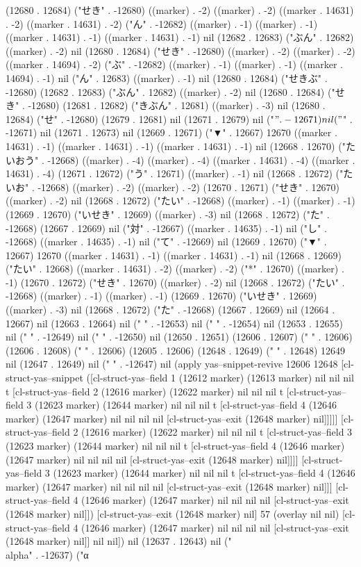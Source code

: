 (12680 . 12684) ("せき" . -12680) ((marker) . -2) ((marker) . -2) ((marker . 14631) . -2) ((marker . 14631) . -2) ("ん" . -12682) ((marker) . -1) ((marker) . -1) ((marker . 14631) . -1) ((marker . 14631) . -1) nil (12682 . 12683) ("ぶん" . 12682) ((marker) . -2) nil (12680 . 12684) ("せき" . -12680) ((marker) . -2) ((marker) . -2) ((marker . 14694) . -2) ("ぶ" . -12682) ((marker) . -1) ((marker) . -1) ((marker . 14694) . -1) nil ("ん" . 12683) ((marker) . -1) nil (12680 . 12684) ("せきぶ" . -12680) (12682 . 12683) ("ぶん" . 12682) ((marker) . -2) nil (12680 . 12684) ("せき" . -12680) (12681 . 12682) ("きぶん" . 12681) ((marker) . -3) nil (12680 . 12684) ("せ" . -12680) (12679 . 12681) nil (12671 . 12679) nil ("$" . -12671) nil ("$" . -12671) nil (12671 . 12673) nil (12669 . 12671) ("▼" . 12667) 12670 ((marker . 14631) . -1) ((marker . 14631) . -1) ((marker . 14631) . -1) nil (12668 . 12670) ("たいおう" . -12668) ((marker) . -4) ((marker) . -4) ((marker . 14631) . -4) ((marker . 14631) . -4) (12671 . 12672) ("う" . 12671) ((marker) . -1) nil (12668 . 12672) ("たいお" . -12668) ((marker) . -2) ((marker) . -2) (12670 . 12671) ("せき" . 12670) ((marker) . -2) nil (12668 . 12672) ("たい" . -12668) ((marker) . -1) ((marker) . -1) (12669 . 12670) ("いせき" . 12669) ((marker) . -3) nil (12668 . 12672) ("た" . -12668) (12667 . 12669) nil ("対" . -12667) ((marker . 14635) . -1) nil ("し" . -12668) ((marker . 14635) . -1) nil ("て" . -12669) nil (12669 . 12670) ("▼" . 12667) 12670 ((marker . 14631) . -1) ((marker . 14631) . -1) nil (12668 . 12669) ("たい" . 12668) ((marker . 14631) . -2) ((marker) . -2) ("*" . 12670) ((marker) . -1) (12670 . 12672) ("せき" . 12670) ((marker) . -2) nil (12668 . 12672) ("たい" . -12668) ((marker) . -1) ((marker) . -1) (12669 . 12670) ("いせき" . 12669) ((marker) . -3) nil (12668 . 12672) ("た" . -12668) (12667 . 12669) nil (12664 . 12667) nil (12663 . 12664) nil ("
" . -12653) nil (" " . -12654) nil (12653 . 12655) nil ("
" . -12649) nil (" " . -12650) nil (12650 . 12651) (12606 . 12607) ("  " . 12606) (12606 . 12608) (" " . 12606) (12605 . 12606) (12648 . 12649) (" " . 12648) 12649 nil (12647 . 12649) nil (" " . -12647) nil (apply yas--snippet-revive 12606 12648 [cl-struct-yas--snippet ([cl-struct-yas--field 1 (12612 marker) (12613 marker) nil nil nil t [cl-struct-yas--field 2 (12616 marker) (12622 marker) nil nil nil t [cl-struct-yas--field 3 (12623 marker) (12644 marker) nil nil nil t [cl-struct-yas--field 4 (12646 marker) (12647 marker) nil nil nil nil [cl-struct-yas--exit (12648 marker) nil]]]]] [cl-struct-yas--field 2 (12616 marker) (12622 marker) nil nil nil t [cl-struct-yas--field 3 (12623 marker) (12644 marker) nil nil nil t [cl-struct-yas--field 4 (12646 marker) (12647 marker) nil nil nil nil [cl-struct-yas--exit (12648 marker) nil]]]] [cl-struct-yas--field 3 (12623 marker) (12644 marker) nil nil nil t [cl-struct-yas--field 4 (12646 marker) (12647 marker) nil nil nil nil [cl-struct-yas--exit (12648 marker) nil]]] [cl-struct-yas--field 4 (12646 marker) (12647 marker) nil nil nil nil [cl-struct-yas--exit (12648 marker) nil]]) [cl-struct-yas--exit (12648 marker) nil] 57 (overlay nil nil) [cl-struct-yas--field 4 (12646 marker) (12647 marker) nil nil nil nil [cl-struct-yas--exit (12648 marker) nil]] nil nil]) nil (12637 . 12643) nil ("\\alpha" . -12637) ("α
